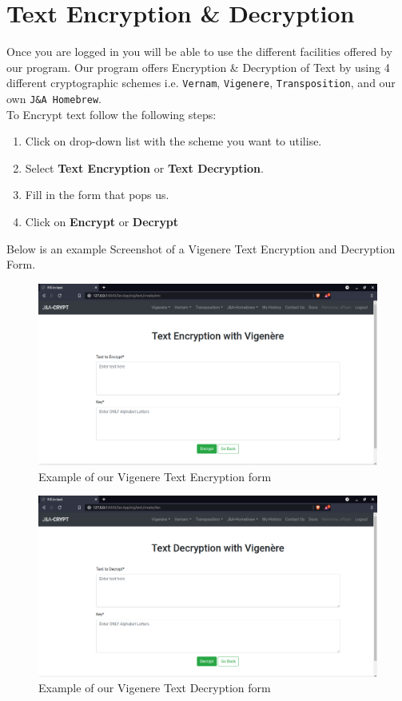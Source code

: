 \documentclass[a4paper, 12pt, titlepage]{report}
\begin{document}
\section{Text Encryption \& Decryption}
Once you are logged in you will be able to use the different facilities offered by our program. Our program offers Encryption \& Decryption of Text by using 4 different cryptographic schemes i.e. \texttt{Vernam}, \texttt{Vigenere}, \texttt{Transposition}, and our own \texttt{J\&A Homebrew}.\\
To Encrypt text follow the following steps:
\begin{enumerate}
\item Click on drop-down list with the scheme you want to utilise.
\item Select \textbf{Text Encryption} or \textbf{Text Decryption}.
\item Fill in the form that pops us.
\item Click on \textbf{Encrypt} or \textbf{Decrypt}
\end{enumerate}
Below is an example Screenshot of a Vigenere Text Encryption and Decryption Form.
\begin{figure}[H]
\centering
\includegraphics[scale=0.3]{./pics/vigtextenc}
\caption{Example of our Vigenere Text Encryption form}
\end{figure}
\begin{figure}[H]
\centering
\includegraphics[scale=0.3]{./pics/vigtextdec}
\caption{Example of our Vigenere Text Decryption form}
\end{figure}
\end{document}
